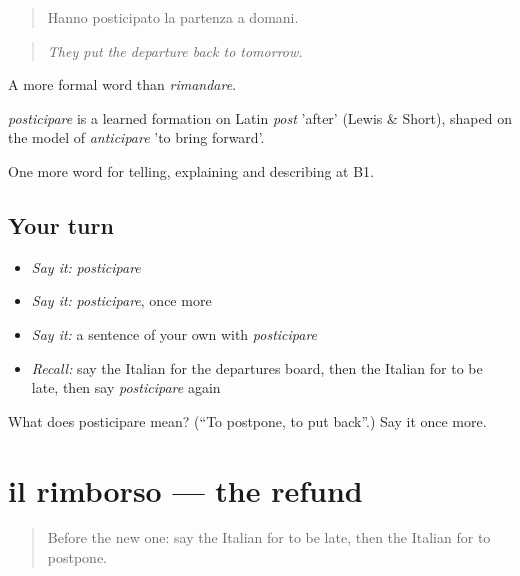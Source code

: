 \begin{quote}
Hanno posticipato la partenza a domani.
\end{quote}

\begin{quote}
\emph{They put the departure back to tomorrow.}
\end{quote}

A more formal word than \emph{rimandare}.

\begin{cousinweb}
\emph{posticipare} is a learned formation on Latin \emph{post} 'after' (Lewis \& Short), shaped on the model of \emph{anticipare} 'to bring forward'.
\end{cousinweb}

\begin{grammarlens}[title={What you've built}]
One more word for telling, explaining and describing at B1.
\end{grammarlens}

\subsection*{Your turn}
\begin{itemize}
\raggedright
  \item \emph{Say it:} \emph{posticipare}
  \item \emph{Say it:} \emph{posticipare}, once more
  \item \emph{Say it:} a sentence of your own with \emph{posticipare}
  \item \emph{Recall:} say the Italian for the departures board, then the Italian for to be late, then say \emph{posticipare} again
\end{itemize}

\begin{tcolorbox}[breakable,colback=teal!4,colframe=teal!35!black,title={Before you move on}]
What does posticipare mean? (\textquotedblleft{}To postpone, to put back\textquotedblright{}.) Say it once more.
\end{tcolorbox}
\section[il rimborso]{il rimborso — the refund}

\label{lesson:IT-C420-rimborso}



\begin{quote}
Before the new one: say the Italian for to be late, then the Italian for to postpone.
\end{quote}


